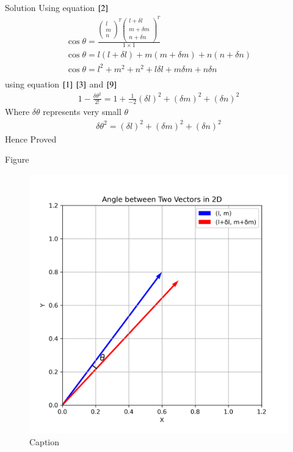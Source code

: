 \documentclass{beamer}
\begin{document}
\begin{frame}{Solution}
Using equation $\eqref{2}$
\begin{align}
    \cos{\theta}=\frac{\begin{pmatrix}l\\m\\n\end{pmatrix}^T \begin{pmatrix}l+\delta l\\m+\delta m\\n+\delta n\end{pmatrix}^T}{1\times 1}\\
    \cos{\theta}=l(l+\delta l)+m(m+\delta m)+n(n+\delta n)\\
    \cos{\theta}=l^2+m^2+n^2+l\delta l+m\delta m+n\delta n\\
\end{align}
using equation $\eqref{1}$ $\eqref{3}$ and $\eqref{9}$
\begin{align}
    1-\frac{\delta\theta^2}{2!}=1+\frac{1}{-2}(\delta l)^2+(\delta m)^2+(\delta n)^2
\end{align}
Where $\delta\theta$ represents very small $\theta$
\begin{align}
    \delta\theta^2=(\delta l)^2+(\delta m)^2+(\delta n)^2
\end{align}
Hence Proved
\end{frame}
\begin{frame}{Figure}
    \begin{figure}[H]
    \centering
    \includegraphics[width=0.6\columnwidth]{figs/vectors.png}
    \caption{Caption}
    \label{fig:placeholder}
\end{figure}
\end{frame}
\end{document}
